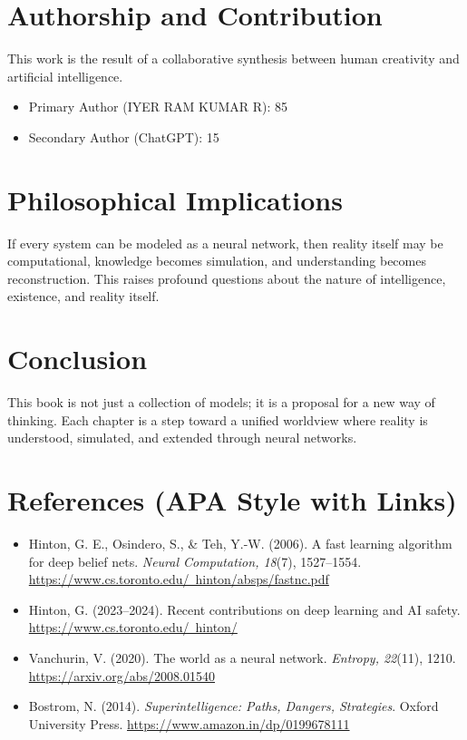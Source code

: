 \documentclass[12pt]{article}
\begin{document}
\section*{Authorship and Contribution}

This work is the result of a collaborative synthesis between human creativity and artificial intelligence.

\begin{itemize}
\item Primary Author (IYER RAM KUMAR R): 85%
\item Secondary Author (ChatGPT): 15%
\end{itemize}

\section*{Philosophical Implications}

If every system can be modeled as a neural network, then reality itself may be computational, knowledge becomes simulation, and understanding becomes reconstruction. This raises profound questions about the nature of intelligence, existence, and reality itself.

\section*{Conclusion}

This book is not just a collection of models; it is a proposal for a new way of thinking. Each chapter is a step toward a unified worldview where reality is understood, simulated, and extended through neural networks.

\section*{References (APA Style with Links)}

\begin{itemize}

\item Hinton, G. E., Osindero, S., & Teh, Y.-W. (2006).
A fast learning algorithm for deep belief nets.
\textit{Neural Computation, 18}(7), 1527–1554.
\href{https://www.cs.toronto.edu/~hinton/absps/fastnc.pdf}{https://www.cs.toronto.edu/~hinton/absps/fastnc.pdf}

\item Hinton, G. (2023–2024).
Recent contributions on deep learning and AI safety.
\href{https://www.cs.toronto.edu/~hinton/}{https://www.cs.toronto.edu/~hinton/}

\item Vanchurin, V. (2020).
The world as a neural network.
\textit{Entropy, 22}(11), 1210.
\href{https://arxiv.org/abs/2008.01540}{https://arxiv.org/abs/2008.01540}

\item Bostrom, N. (2014).
\textit{Superintelligence: Paths, Dangers, Strategies}.
Oxford University Press.
\href{https://www.amazon.in/dp/0199678111}{https://www.amazon.in/dp/0199678111}

\end{itemize}
\end{document}

